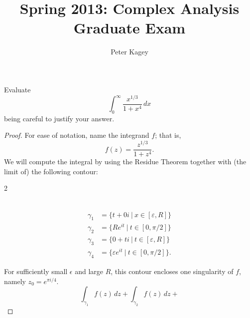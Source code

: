 \documentclass{article}
\newenvironment{problem}[2][Problem]{\begin{trivlist}
\item[\hskip \labelsep {\bfseries #1}\hskip \labelsep {\bfseries #2.}]}{\end{trivlist}}
\begin{document}
\title{Spring 2013: Complex Analysis Graduate Exam}
\author{Peter Kagey}

\maketitle

\begin{problem}{1}
  Evaluate \[
    \int_0^\infty \frac{x^{1/3}}{1 + x^4}\,dx
  \] being careful to justify your answer.
\end{problem}

\begin{proof}
  For ease of notation, name the integrand $f$; that is, \[
    f(z) = \frac{z^{1/3}}{1 + z^4}.
  \]
  We will compute the integral by using the Residue Theorem together with (the
  limit of) the following contour:
  \begin{multicols}{2}
  \\
  \begin{align}
    \gamma_{1} &= \{t + 0i\ |\ x \in [\varepsilon, R] \} \\
    \gamma_{2} &= \{R e^{it}\ |\ t \in [0,\pi/2] \} \\
    \gamma_{3} &= \{0 + ti\ |\ t \in [\varepsilon, R]\} \\
    \gamma_{4} &= \{\varepsilon e^{it}\ |\ t \in [0, \pi/2]\}.
  \end{align}
  \end{multicols}
  For sufficiently small $\epsilon$ and large $R$, this contour encloses one
  singularity of $f$, namely $z_0 = e^{\pi i/4}$.
  \[
    \int_{\gamma_1} f(z)\,dz +
    \int_{\gamma_2} f(z)\,dz +
\]
\end{proof}
\end{document}
